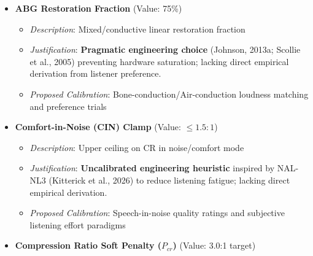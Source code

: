 \documentclass[
  12pt,
]{article}
\providecommand{\tightlist}{%
  \setlength{\itemsep}{0pt}\setlength{\parskip}{0pt}}
\begin{document}
\begin{itemize}
  \begin{itemize}
  \tightlist
  \item
    \emph{Description}: Attenuation past 1.7x Dead Region boundary
  \item
    \emph{Justification}: \textbf{Mixed derivation}: The \(1.7 f_e\)
    boundary is grounded in psychoacoustic dead-region literature
    (Moore, 2001) to prevent off-frequency distortion, but the 30
    dB/octave attenuation slope is a \textbf{pragmatic engineering
    choice} lacking direct empirical validation.
  \item
    \emph{Proposed Calibration}: TEN-test validated behavioral roll-off
    boundaries
  \end{itemize}
\item
  \textbf{ABG Restoration Fraction} (Value: 75\%)

  \begin{itemize}
  \tightlist
  \item
    \emph{Description}: Mixed/conductive linear restoration fraction
  \item
    \emph{Justification}: \textbf{Pragmatic engineering choice}
    (Johnson, 2013a; Scollie et al., 2005) preventing hardware
    saturation; lacking direct empirical derivation from listener
    preference.
  \item
    \emph{Proposed Calibration}: Bone-conduction/Air-conduction loudness
    matching and preference trials
  \end{itemize}
\item
  \textbf{Comfort-in-Noise (CIN) Clamp} (Value: \(\le 1.5:1\))

  \begin{itemize}
  \tightlist
  \item
    \emph{Description}: Upper ceiling on CR in noise/comfort mode
  \item
    \emph{Justification}: \textbf{Uncalibrated engineering heuristic}
    inspired by NAL-NL3 (Kitterick et al., 2026) to reduce listening
    fatigue; lacking direct empirical derivation.
  \item
    \emph{Proposed Calibration}: Speech-in-noise quality ratings and
    subjective listening effort paradigms
  \end{itemize}
\item
  \textbf{Compression Ratio Soft Penalty (\(P_{cr}\))} (Value: 3.0:1
  target)


\end{itemize}
\end{document}
